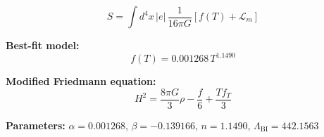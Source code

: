 
\begin{equation}
  S = \int d^4x \, |e| \, \frac{1}{16\pi G} \left[ f(T) + \mathcal{L}_m \right]
\end{equation}

\textbf{Best-fit model:}
\begin{equation}
  f(T) = 0.001268 \, T^{1.1490}
\end{equation}

\textbf{Modified Friedmann equation:}
\begin{equation}
  H^2 = \frac{8\pi G}{3} \rho - \frac{f}{6} + \frac{T f_T}{3}
\end{equation}

\textbf{Parameters:}
$\alpha = 0.001268$, \quad
$\beta = -0.139166$, \quad
$n = 1.1490$, \quad
$\Lambda_{\text{BI}} = 442.1563$
